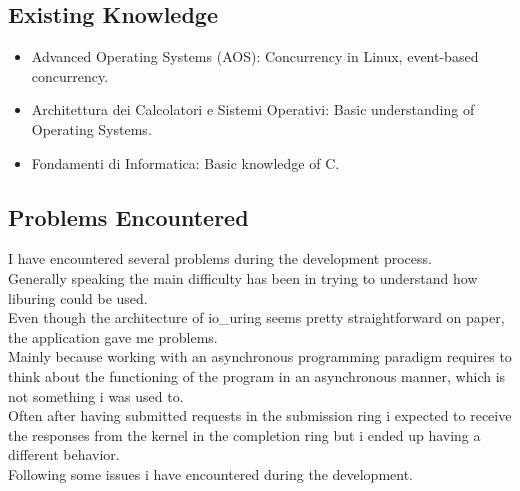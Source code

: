 \documentclass[10pt, oneside,english]{article}   	%
\begin{document}
\subsection{Existing Knowledge}

\begin{itemize}
    \item Advanced Operating Systems (AOS): Concurrency in Linux, event-based concurrency.
    \item Architettura dei Calcolatori e Sistemi Operativi: Basic understanding of Operating Systems.
    \item Fondamenti di Informatica: Basic knowledge of C.
\end{itemize}

\subsection{Problems Encountered}
I have encountered several problems during the development process. \\
Generally speaking the main difficulty has been in trying to understand how liburing could be used. \\
Even though the architecture of io\_uring seems pretty straightforward on paper, the application gave me problems.\\ 
Mainly because working with an asynchronous programming paradigm requires to think about the functioning of the program in an asynchronous manner, which is not something i was used to. \\
Often after having submitted requests in the submission ring i expected to receive the responses from the kernel in the completion ring but i ended up having a different behavior. \\
Following some issues i have encountered during the development.
\end{document}
